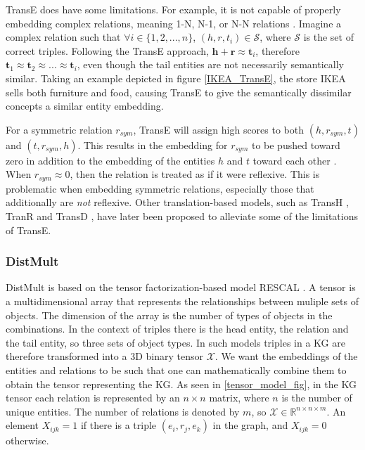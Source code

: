 TransE does have some limitations. For example, it is not capable of properly embedding complex relations, meaning 1-N, N-1, or N-N relations \cite{transH, transR}. Imagine a complex relation such that $\forall i \in \{1,2, ..., n\}$, $(h, r, t_i )\in \mathcal{S}$, where $\mathcal{S}$ is the set of correct triples. Following the TransE approach, $\textbf{h}+\textbf{r}\approx \textbf{t}_i$, therefore $\textbf{t}_1 \approx \textbf{t}_2 \approx ... \approx \textbf{t}_i$, even though the tail entities are not necessarily semantically similar. Taking an example depicted in figure \ref{IKEA_TransE}, the store IKEA sells both furniture and food, causing TransE to give the semantically dissimilar concepts a similar entity embedding. 

For a symmetric relation $r_{sym}$, TransE will assign high scores to both $(h, r_{sym}, t)$ and $(t, r_{sym}, h)$. This results in the embedding for $r_{sym}$ to be pushed toward zero in addition to the embedding of the entities $h$ and $t$ toward each other \cite{wang2018evaluating}. When $r_{sym} \approx 0$, then the relation is treated as if it were reflexive. This is problematic when embedding symmetric relations, especially those that additionally are \textit{not} reflexive. Other translation-based models, such as TransH \cite{transH}, TranR \cite{transR} and TransD \cite{transD}, have later been proposed to alleviate some of the limitations of TransE.

\subsubsection{DistMult}
DistMult is based on the tensor factorization-based model RESCAL \cite{RESCAL}. A tensor is a multidimensional array that represents the relationships between muliple sets of objects. The dimension of the array is the number of types of objects in the combinations. In the context of triples there is the head entity, the relation and the tail entity, so three sets of object types. In such models triples in a KG are therefore transformed into a 3D binary tensor $\mathcal{X}$. We want the embeddings of the entities and relations to be such that one can mathematically combine them to obtain the tensor representing the KG. As seen in \cref{tensor_model_fig}, in the KG tensor each relation is represented by an $n \times n$ matrix, where $n$ is the number of unique entities. The number of relations is denoted by $m$, so $\mathcal{X}\in \mathbb{R}^{n \times n \times m}$. An element $X_{ijk} = 1$ if there is a triple $(e_i, r_j, e_k)$ in the graph, and $X_{ijk} = 0$ otherwise.

